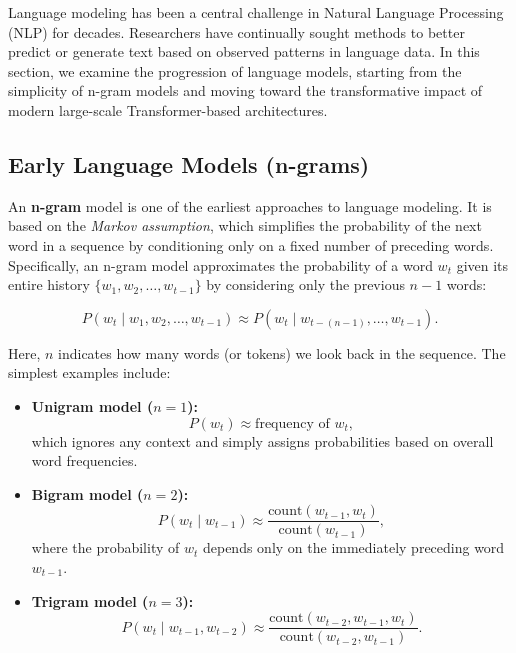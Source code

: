\label{sec:historical}
\noindent
Language modeling has been a central challenge in Natural Language Processing (NLP) for decades. Researchers have continually sought methods to better predict or generate text based on observed patterns in language data. In this section, we examine the progression of language models, starting from the simplicity of n-gram models and moving toward the transformative impact of modern large-scale Transformer-based architectures.


\subsection{Early Language Models (n-grams)}
\label{sec:early_n_grams}

\noindent
An \textbf{n-gram} model is one of the earliest approaches to language modeling. It is based on the \emph{Markov assumption}, which simplifies the probability of the next word in a sequence by conditioning only on a fixed number of preceding words. Specifically, an n-gram model approximates the probability of a word $w_t$ given its entire history $\{w_1, w_2, \ldots, w_{t-1}\}$ by considering only the previous $n-1$ words:

\[
P(w_t \mid w_1, w_2, \ldots, w_{t-1}) \approx P(w_t \mid w_{t-(n-1)}, \ldots, w_{t-1}).
\]

\noindent
Here, $n$ indicates how many words (or tokens) we look back in the sequence. The simplest examples include:
\begin{itemize}
    \item \textbf{Unigram model ($n = 1$):}
    \[
    P(w_t) \approx \text{frequency of } w_t,
    \]
    which ignores any context and simply assigns probabilities based on overall word frequencies.

    \item \textbf{Bigram model ($n = 2$):}
    \[
    P(w_t \mid w_{t-1}) \approx \frac{\text{count}(w_{t-1}, w_t)}{\text{count}(w_{t-1})},
    \]
    where the probability of $w_t$ depends only on the immediately preceding word $w_{t-1}$.

    \item \textbf{Trigram model ($n = 3$):}
    \[
    P(w_t \mid w_{t-1}, w_{t-2}) \approx \frac{\text{count}(w_{t-2}, w_{t-1}, w_t)}{\text{count}(w_{t-2}, w_{t-1})}.
    \]
\end{itemize}


